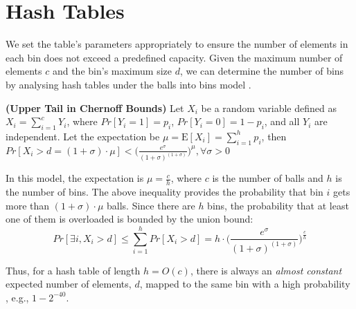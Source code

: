 
\section{Hash Tables}\label{Preliminary-Hash-Table}

We set the table's parameters appropriately to ensure the number of elements in each bin does not exceed a predefined capacity. Given the maximum number of elements $c$ and the bin's maximum size $d$, we can determine the number of bins by analysing hash tables under the balls into bins model  \cite{DBLP:conf/stoc/BerenbrinkCSV00}.
\vspace{-1mm}
\begin{theorem}\label{chernoff}\textbf{(Upper Tail in Chernoff Bounds)} Let $X_{\scriptscriptstyle i}$ be a random variable defined as $X_{\scriptscriptstyle i}=\sum\limits^{\scriptscriptstyle c}_{\scriptscriptstyle  i=1} Y_{\scriptscriptstyle i}$, where $Pr[Y_{\scriptscriptstyle i}=1]=p_{\scriptscriptstyle i}$, $Pr[Y_{\scriptscriptstyle i}=0]=1-p_{\scriptscriptstyle i}$, and all $Y_{\scriptscriptstyle i}$ are independent. Let the expectation be $\mu=\mathrm{E}[X_{\scriptscriptstyle i}]=\sum\limits ^{\scriptscriptstyle h}_{\scriptscriptstyle  i=1} p_{\scriptscriptstyle i}$, then 
$Pr[X_{\scriptscriptstyle i}>d=(1+\sigma)\cdot \mu]<\Big(\frac{e^{\scriptscriptstyle \sigma}}{(1+\sigma)^{\scriptscriptstyle (1+\sigma)}}\Big)^{\scriptscriptstyle \mu}, \forall \sigma>0$
\end{theorem}

In this model, the expectation is  $\mu=\frac{c}{h}$, where $c$ is the number of  balls and $h$ is the number of bins. The above inequality provides the probability that bin $i$ gets more than $(1+\sigma)\cdot \mu$ balls. Since there are $h$ bins, the probability that at least one of them is overloaded is bounded by the union bound:
\begin{equation}\label{equation:the-bound}
Pr[\exists i, X_{\scriptscriptstyle i}>d]\leq \sum\limits^{\scriptscriptstyle h}_{\scriptscriptstyle i=1}Pr[X_{\scriptscriptstyle i}>d] = h\cdot  \Big(\frac{e^{\scriptscriptstyle \sigma}}{(1+\sigma)^{\scriptscriptstyle (1+\sigma)}}\Big)^{\scriptscriptstyle \frac{c}{h}}
\end{equation}

Thus, for a hash table of length $h=O(c)$, there is always an  \emph{almost constant} expected number of elements, $d$,  mapped to the same bin  with a high probability \cite{DBLP:conf/ccs/PapamanthouTT08}, e.g., $1-2^{\scriptscriptstyle -40}$.